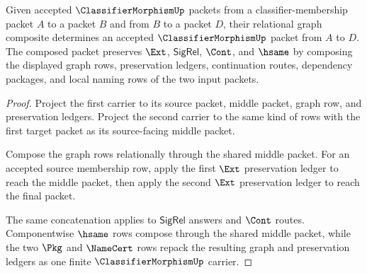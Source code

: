 \begin{theorem}
\label{thm:classifiermorphism-composition-closure}
Given accepted $\ClassifierMorphismUp$ packets from a classifier-membership packet $A$ to a packet $B$ and from $B$ to a packet $D$, their relational graph composite determines an accepted $\ClassifierMorphismUp$ packet from $A$ to $D$. The composed packet preserves $\Ext$, $\mathsf{SigRel}$, $\Cont$, and $\hsame$ by composing the displayed graph rows, preservation ledgers, continuation routes, dependency packages, and local naming rows of the two input packets.
\end{theorem}
\begin{proof}
Project the first carrier to its source packet, middle packet, graph row, and preservation ledgers. Project the second carrier to the same kind of rows with the first target packet as its source-facing middle packet.

Compose the graph rows relationally through the shared middle packet. For an accepted source membership row, apply the first $\Ext$ preservation ledger to reach the middle packet, then apply the second $\Ext$ preservation ledger to reach the final packet.

The same concatenation applies to $\mathsf{SigRel}$ answers and $\Cont$ routes. Componentwise $\hsame$ rows compose through the shared middle packet, while the two $\Pkg$ and $\NameCert$ rows repack the resulting graph and preservation ledgers as one finite $\ClassifierMorphismUp$ carrier.
\end{proof}

